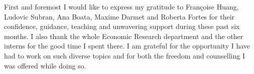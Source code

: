 First and foremost I would like to express my gratitude to Françoise Huang, Ludovic Subran, Ana Boata, Maxime Darmet and Roberta Fortes for their confidence, guidance, teaching and unwavering support during these past six months. 
I also thank the whole Economic Research department and the other interns for the good time I spent there. 
I am grateful for the opportunity I have had to work on such diverse topics and for both the freedom and counselling I was offered while doing so. 